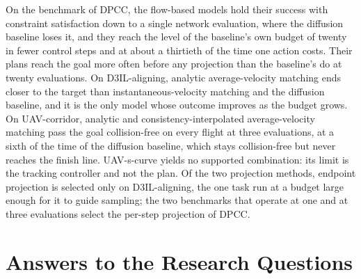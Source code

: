 On the benchmark of \ac{DPCC}, the flow-based models hold their success with constraint satisfaction down
to a single network evaluation, where the diffusion baseline loses it, and they reach the level of the
baseline's own budget of twenty in fewer control steps and at about a thirtieth of the time one action
costs. Their plans reach the goal more often before any projection than the baseline's do at twenty
evaluations. On D3IL-aligning, analytic average-velocity matching ends closer to the target than
instantaneous-velocity matching and the diffusion baseline, and it is the only model whose outcome
improves as the budget grows. On UAV-corridor, analytic and consistency-interpolated average-velocity
matching pass the goal collision-free on every flight at three evaluations, at a sixth of the time of the
diffusion baseline, which stays collision-free but never reaches the finish line. UAV-s-curve yields no
supported combination: its limit is the tracking controller and not the plan. Of the two projection
methods, endpoint projection is selected only on D3IL-aligning, the one task run at a budget large enough
for it to guide sampling; the two benchmarks that operate at one and at three evaluations select the
per-step projection of \ac{DPCC}.


\section{Answers to the Research Questions}\label{sec:conc:rqs}

